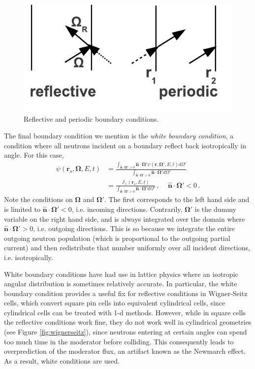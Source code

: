 \begin{figure}[h] 
    \centering
    \includegraphics[keepaspectratio, width = 2.0 in]{images/reflectiveperiodic}
    \caption{Reflective and periodic boundary conditions.}
    \label{fig:reflectiveperiodic}
\end{figure}

The final boundary condition we mention is the \textit{white boundary condition}, a condition where all neutrons incident on a boundary reflect back isotropically in angle.  For this case,
\begin{equation}
\begin{split}
 \psi(\mathbf{r}_s,\mathbf{\Omega},E,t) &= \frac{ \int_{\mathbf{\hat{n}} \cdot \mathbf{\Omega}' > 0}   \mathbf{\hat{n}} \cdot \mathbf{\Omega}' \psi (\mathbf{r},\mathbf{\Omega}',E,t)d\Omega' } {  \int_{\mathbf{\hat{n}} \cdot \mathbf{\Omega}' > 0}  \mathbf{\hat{n}} \cdot \mathbf{\Omega}'  d\Omega'    }  \\
             &= \frac{ J_+ (\mathbf{r}_s,E,t) } {  \int_{\mathbf{\hat{n}} \cdot \mathbf{\Omega}' > 0}  \mathbf{\hat{n}} \cdot \mathbf{\Omega}'  d\Omega'    }\, , \, \, \, \,  \, \, \, \mathbf{\hat{n}} \cdot \mathbf{\Omega}' < 0 \, .
\end{split}
\end{equation}
Note the conditions on $\mathbf{\Omega}$ and $\mathbf{\Omega}'$.  The first corresponds to the left hand side and is limited to $\mathbf{\hat{n}} \cdot \mathbf{\Omega}' < 0$, i.e. incoming directions.  Contrarily, $\mathbf{\Omega}'$ is the dummy variable on the right hand side, and is always integrated over the domain where $\mathbf{\hat{n}} \cdot \mathbf{\Omega}' > 0$, i.e. outgoing directions.  This is so because we integrate the entire outgoing neutron population (which is proportional to the outgoing partial current) and then redistribute that number uniformly over all incident directions, i.e. isotropically.

White boundary conditions have had use in lattice physics where an isotropic angular distribution is sometimes relatively accurate.  In particular, the white boundary condition provides a useful fix for reflective conditions in Wigner-Seitz cells, which convert square pin cells into equivalent cylindrical cells, since cylindrical cells can be treated with 1-d methods.  However, while in square cells the reflective conditions work fine, they do not work well in cylindrical geometries (see Figure \ref{fig:wignerseitz}), since neutrons entering at certain angles can spend too much time in the moderator before colliding.  This consequently leads to overprediction of the moderator flux, an artifact known as the Newmarch effect. As a result, white conditions are used.


